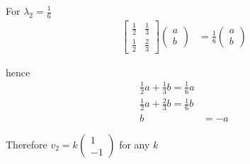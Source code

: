 \documentclass[a4paper, 10pt]{article}
\begin{document}
For  $\lambda_2 = \frac{1}{6}$
\begin{align*}
   \begin{bmatrix} 
      \frac{1}{2} & \frac{1}{3} \\ \frac{1}{2} & \frac{2}{3}    
      \end{bmatrix} \begin{pmatrix} a \\b \end{pmatrix}  &= \frac{1}{6}\begin{pmatrix} a \\ b \end{pmatrix} 
\end{align*}

hence
\begin{align*}
      \frac{1}{2} a + \frac{1}{3}b = \frac{1}{6}a \\
      \frac{1}{2} a + \frac{2}{3} b = \frac{1}{6}b \\
      b &= -a
\end{align*}

Therefore $v_2 = k \begin{pmatrix} 1 \\ -1 \end{pmatrix} $ for any $k$ \\
\end{document}
